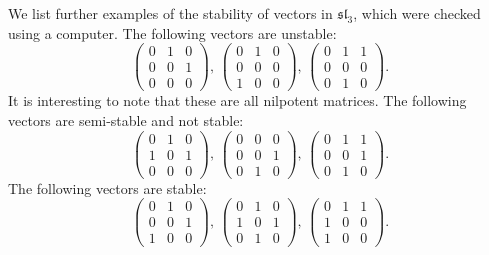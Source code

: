 \begin{example}
We list further examples of the stability of vectors in $\mathfrak{sl}_3$, which were checked using a computer.
The following vectors are unstable:
$$
\begin{pmatrix} 
	0 & 1 & 0 \\ 
	0 & 0 & 1 \\
	0 & 0 & 0 
\end{pmatrix}, \, 
\begin{pmatrix} 
	0 & 1 & 0 \\ 
	0 & 0 & 0 \\
	1 & 0 & 0 
\end{pmatrix}, \, 
\begin{pmatrix} 
	0 & 1 & 1 \\ 
	0 & 0 & 0 \\
	0 & 1 & 0 
\end{pmatrix}.
$$
It is interesting to note that these are all nilpotent matrices.
The following vectors are semi-stable and not stable:
$$
\begin{pmatrix} 
	0 & 1 & 0 \\ 
	1 & 0 & 1 \\
	0 & 0 & 0 
\end{pmatrix}, \, 
\begin{pmatrix} 
	0 & 0 & 0 \\ 
	0 & 0 & 1 \\
	0 & 1 & 0 
\end{pmatrix}, \, 
\begin{pmatrix} 
	0 & 1 & 1 \\ 
	0 & 0 & 1 \\
	0 & 1 & 0 
\end{pmatrix}.
$$
The following vectors are stable:
$$
\begin{pmatrix} 
	0 & 1 & 0 \\ 
	0 & 0 & 1 \\
	1 & 0 & 0 
\end{pmatrix}, \, 
\begin{pmatrix} 
	0 & 1 & 0 \\ 
	1 & 0 & 1 \\
	0 & 1 & 0 
\end{pmatrix}, \, 
\begin{pmatrix} 
	0 & 1 & 1 \\ 
	1 & 0 & 0 \\
	1 & 0 & 0 
\end{pmatrix}.
$$ \\
\end{example}

